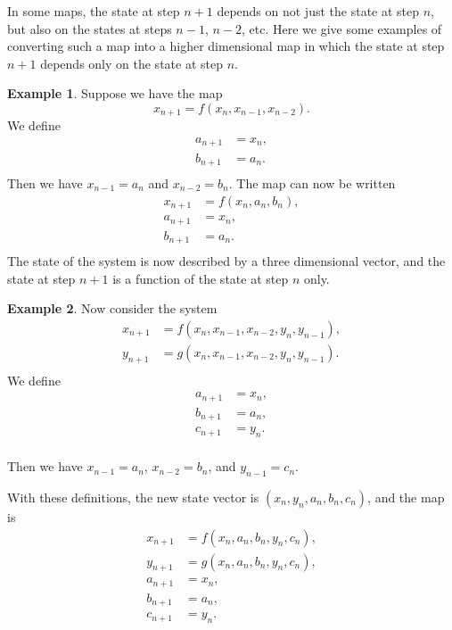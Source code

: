 \documentclass[reqno]{immbook}
\numberwithin{equation}{chapter}
\numberwithin{question}{section}
\numberwithin{theorem}{chapter}
\numberwithin{figure}{chapter}
\theoremstyle{definition}
\newtheorem{example}{Example}[section]
\begin{document}
In some maps, the state at step $n+1$ depends on not just the state at step $n$,
but also on the states at steps $n-1$, $n-2$, etc.
Here we give some examples of
converting such a map into a higher dimensional map in which the state at
step $n+1$ depends only on the state at step $n$.
\begin{example}
Suppose we have the map
\begin{equation}
   x_{n+1} = f(x_{n},x_{n-1},x_{n-2}).
\end{equation}
We define
\begin{equation}
\begin{split}
   a_{n+1} & = x_{n}, \\
   b_{n+1} & = a_{n}. \\
\end{split}
\end{equation}
Then we have $x_{n-1} = a_{n}$ and $x_{n-2} = b_{n}$.
The map can now be written
\begin{equation}
\begin{split}
   x_{n+1} & = f(x_{n},a_{n},b_{n}), \\
   a_{n+1} & = x_{n}, \\
   b_{n+1} & = a_{n}. \\
\end{split}
\end{equation}
The state of the system is now described by a three dimensional vector,
and the state at step $n+1$ is a function of the state at step $n$ only.
\end{example}
\begin{example}
Now consider the system
\begin{equation}
\begin{split}
   x_{n+1} & = f(x_{n},x_{n-1},x_{n-2},y_{n},y_{n-1}), \\
   y_{n+1} & = g(x_{n},x_{n-1},x_{n-2},y_{n},y_{n-1}). \\
\end{split}
\end{equation}
We define
\begin{equation}
\begin{split}
   a_{n+1} & = x_{n}, \\
   b_{n+1} & = a_{n}, \\
   c_{n+1} & = y_{n}. \\
\end{split}
\end{equation}

Then we have $x_{n-1} = a_{n}$, $x_{n-2} = b_{n}$,
and $y_{n-1} = c_{n}$.

With these definitions,
the new state vector is $(x_n,y_n,a_n,b_n,c_n)$, and the map is
\begin{equation}
\begin{split}
   x_{n+1} & = f(x_n,a_n,b_n,y_n,c_n), \\
   y_{n+1} & = g(x_n,a_n,b_n,y_n,c_n), \\
   a_{n+1} & = x_n, \\
   b_{n+1} & = a_n, \\
   c_{n+1} & = y_n.
\end{split}
\end{equation}
\end{example}
\end{document}
